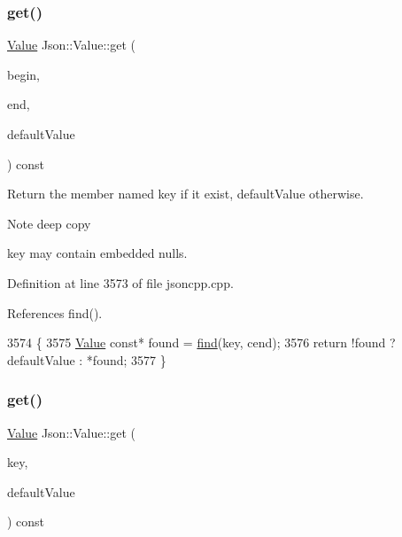 \subsubsection{\texorpdfstring{get()}{get()}\hspace{0.1cm}{\footnotesize\ttfamily [3/4]}}
{\footnotesize\ttfamily \hyperlink{class_json_1_1_value}{Value} Json\+::\+Value\+::get (\begin{DoxyParamCaption}\item[{const char $\ast$}]{begin,  }\item[{const char $\ast$}]{end,  }\item[{const \hyperlink{class_json_1_1_value}{Value} \&}]{default\+Value }\end{DoxyParamCaption}) const}

Return the member named key if it exist, default\+Value otherwise. \begin{DoxyNote}{Note}
deep copy 

key may contain embedded nulls. 
\end{DoxyNote}


Definition at line 3573 of file jsoncpp.\+cpp.



References find().


\begin{DoxyCode}
3574 \{
3575   \hyperlink{class_json_1_1_value_ada6ba1369448fb0240bccc36efaa46f7}{Value} \textcolor{keyword}{const}* found = \hyperlink{class_json_1_1_value_afb007b9ce9b2cf9d5f667a07e5e0349f}{find}(key, cend);
3576   \textcolor{keywordflow}{return} !found ? defaultValue : *found;
3577 \}
\end{DoxyCode}
\mbox{\label{class_json_1_1_value_a7406e6af727c288bf8ab59945ece686a}} 
\subsubsection{\texorpdfstring{get()}{get()}\hspace{0.1cm}{\footnotesize\ttfamily [4/4]}}
{\footnotesize\ttfamily \hyperlink{class_json_1_1_value}{Value} Json\+::\+Value\+::get (\begin{DoxyParamCaption}\item[{const \hyperlink{json_8h_a1e723f95759de062585bc4a8fd3fa4be}{J\+S\+O\+N\+C\+P\+P\+\_\+\+S\+T\+R\+I\+NG} \&}]{key,  }\item[{const \hyperlink{class_json_1_1_value}{Value} \&}]{default\+Value }\end{DoxyParamCaption}) const}

